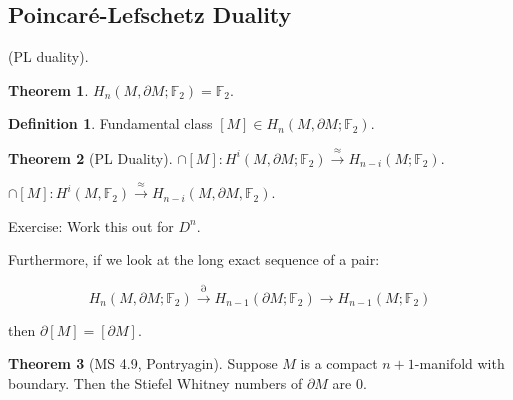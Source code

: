 \documentclass{article}
\theoremstyle{definition}
\newtheorem*{definition}{Definition}
\newtheorem{theorem}{Theorem}
\begin{document}
    \subsection*{Poincar\'e-Lefschetz Duality}

    (PL duality).

    \begin{theorem}
        \(H_n(M, \partial M; \mathbb{F}_2) = \mathbb{F}_2\).
    \end{theorem}

    \begin{definition}
        Fundamental class \([M] \in H_n(M, \partial M; \mathbb{F}_2)\).
    \end{definition}

    \begin{theorem}
        [PL Duality]  \(\cap [M]: H^i(M, \partial M; \mathbb{F}_2) \xrightarrow{\approx} H_{n-i} (M;\mathbb{F}_2)\).

        \(\cap [M]: H^i(M,\mathbb{F}_2) \xrightarrow{\approx} H_{n-i} (M, \partial M, \mathbb{F}_2)\).
    \end{theorem}

    Exercise: Work this out for \(D^n\).

    Furthermore, if we look at the long exact sequence of a pair:

    \[
        H_n(M, \partial M; \mathbb{F}_2) \xrightarrow{\partial} H_{n-1}(\partial M;\mathbb{F}_2) \to H_{n-1}(M;\mathbb{F}_2)  
    \]

    then \(\partial [M] = [\partial M]\).

    \begin{theorem}
        [MS 4.9, Pontryagin] Suppose \(M\) is a compact \(n+1\)-manifold with boundary. Then the Stiefel Whitney numbers of \(\partial M\) are \(0\).
    \end{theorem}
\end{document}
